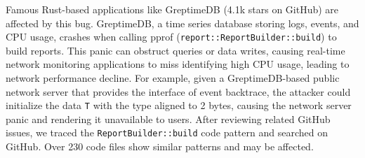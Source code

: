 Famous Rust-based applications like GreptimeDB\cite{greptimedb} (4.1k stars on GitHub) are affected by this bug. GreptimeDB, a time series database storing logs, events, and CPU usage, crashes when calling pprof (\texttt{report::ReportBuilder::build}) to build reports. This panic can obstruct queries or data writes, causing real-time network monitoring applications to miss identifying high CPU usage, leading to network performance decline.
%
{For example, given a GreptimeDB-based public network server that provides the interface of event backtrace, the attacker could initialize the data \texttt{T} with the type aligned to 2 bytes, causing the network server panic and rendering it unavailable to users.}
After reviewing related GitHub issues, we traced the 	\texttt{ReportBuilder::build} code pattern and searched on GitHub. 
Over 230 code files show similar patterns and may be affected.





